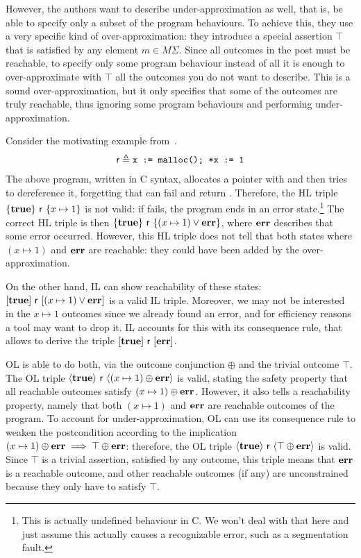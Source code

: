 However, the authors want to describe under-approximation as well, that is, be able to specify only a subset of the program behaviours. To achieve this, they use a very specific kind of over-approximation: they introduce a special assertion $\top$ that is satisfied by any element $m \in M \Sigma$. Since all outcomes in the post must be reachable, to specify only some program behaviour instead of all it is enough to over-approximate with $\top$ all the outcomes you do not want to describe. This is a sound over-approximation, but it only specifies that some of the outcomes are truly reachable, thus ignoring some program behaviours and performing under-approximation.

\begin{example}\label{ex:sota:ol}
	Consider the motivating example from~\cite[\S~2.1]{ZDS23}.
	\begin{align*}
		\mathsf{r} \triangleq \texttt{x := malloc(); *x := 1}
	\end{align*}
	The above program, written in C syntax, allocates a pointer with  and then tries to dereference it, forgetting that  can fail and return . Therefore, the HL triple $\{\textbf{true}\}~\mathsf{r}~\{x \mapsto 1\}$ is not valid: if  fails, the program ends in an error state.\footnote{This is actually undefined behaviour in C. We won't deal with that here and just assume this actually causes a recognizable error, such as a segmentation fault.} The correct HL triple is then $\{\textbf{true}\}~\mathsf{r}~\{(x \mapsto 1) \lor \textbf{err}\}$, where $\textbf{err}$ describes that some error occurred. However, this HL triple does not tell that both states where $(x \mapsto 1)$ and $\textbf{err}$ are reachable: they could have been added by the over-approximation.

	On the other hand, IL can show reachability of these states: $[\textbf{true}]~\mathsf{r}~[(x \mapsto 1) \lor \textbf{err}]$ is a valid IL triple. Moreover, we may not be interested in the $x \mapsto 1$ outcomes since we already found an error, and for efficiency reasons a tool may want to drop it. IL accounts for this with its consequence rule, that allows to derive the triple $[\textbf{true}]~\mathsf{r}~[\textbf{err}]$.

	OL is able to do both, via the outcome conjunction $\oplus$ and the trivial outcome $\top$. The OL triple $\langle {\textbf{true}}\rangle~\mathsf{r}~\langle{(x \mapsto 1) \oplus \textbf{err}}\rangle$ is valid, stating the safety property that all reachable outcomes satisfy $(x \mapsto 1) \oplus \textbf{err}$. However, it also tells a reachability property, namely that both $(x \mapsto 1)$ and $\textbf{err}$ are reachable outcomes of the program. To account for under-approximation, OL can use its consequence rule to weaken the postcondition according to the implication $(x \mapsto 1) \oplus \textbf{err} \implies \top \oplus \textbf{err}$: therefore, the OL triple $\langle {\textbf{true}}\rangle~\mathsf{r}~\langle{\top \oplus \textbf{err}}\rangle$ is valid. Since $\top$ is a trivial assertion, satisfied by any outcome, this triple means that $\textbf{err}$ is a reachable outcome, and other reachable outcomes (if any) are unconstrained because they only have to satisfy $\top$.
\end{example}

